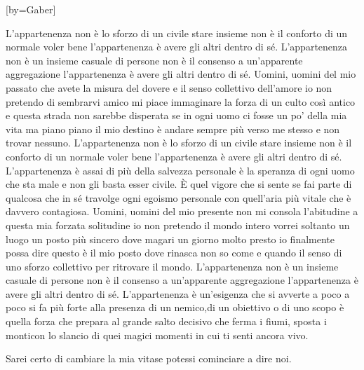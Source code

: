 [by={Gaber}]
\chordsoff
\beginverse*
\rule{0pt}{13pt}L'appartenenza non è lo sforzo \brk di un civile stare insieme
non è il conforto di un normale voler bene
l'appartenenza è avere gli altri dentro di sé.
\endverse
\beginverse*
L'appartenenza \brk  non è un insieme casuale di persone
non è il consenso a un'apparente aggregazione
l'appartenenza è avere gli altri dentro di sé.
\endverse
\beginverse*
Uomini, uomini del mio passato
che avete la misura del dovere
e il senso collettivo dell'amore
io non pretendo di sembrarvi amico
mi piace immaginare
la forza di un culto così antico
e questa strada non sarebbe disperata
se in ogni uomo ci fosse un po' della mia vita
ma piano piano il mio destino
è andare sempre più verso me stesso
e non trovar nessuno.
\endverse
\beginverse*
L'appartenenza non è lo sforzo \brk  di un civile stare insieme
non è il conforto di un normale voler bene
l'appartenenza è avere gli altri dentro di sé.
\endverse
\beginverse*
L'appartenenza è assai di più \brk  della salvezza personale
è la speranza di ogni uomo che sta male
e non gli basta esser civile.
È quel vigore che si sente \brk  se fai parte di qualcosa
che in sé travolge ogni egoismo personale
con quell'aria più vitale \brk  che è davvero contagiosa.
\endverse
\beginverse*
Uomini, uomini del mio presente
non mi consola l'abitudine
a questa mia forzata solitudine
io non pretendo il mondo intero
vorrei soltanto un luogo un posto più sincero
dove magari un giorno molto presto
io finalmente possa dire questo è il mio posto
dove rinasca non so come e quando
il senso di uno sforzo collettivo \brk  per ritrovare il mondo.
\endverse
\beginverse*
L'appartenenza \brk  non è un insieme casuale di persone
non è il consenso a un'apparente aggregazione
l'appartenenza è avere gli altri dentro di sé.
\endverse
\beginverse*
L'appartenenza è un'esigenza \brk  che si avverte a poco a poco
si fa più forte alla presenza di un nemico,\brk di un obiettivo o di uno scopo
è quella forza che prepara \brk  al grande salto decisivo
che ferma i fiumi, sposta i monti\brk con lo slancio di quei magici momenti
in cui ti senti ancora vivo.

Sarei certo di cambiare la mia vita\brk se potessi cominciare a dire noi.
\endverse
\endsong

